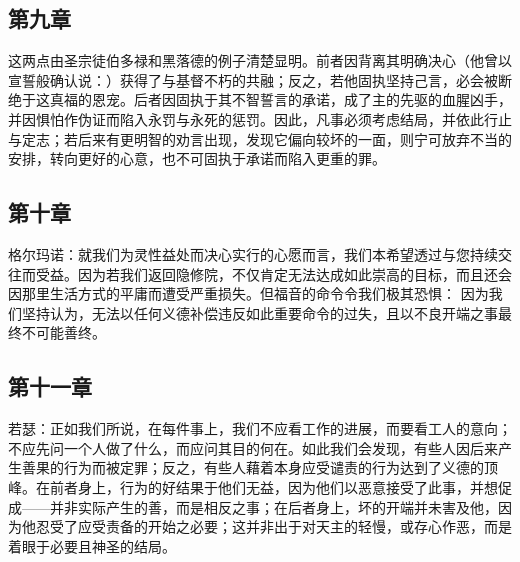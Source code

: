 
\subsection{第九章}

\par

这两点由圣宗徒伯多禄和黑落德的例子清楚显明。前者因背离其明确决心（他曾以宣誓般确认说：）获得了与基督不朽的共融；反之，若他固执坚持己言，必会被断绝于这真福的恩宠。后者因固执于其不智誓言的承诺，成了主的先驱的血腥凶手，并因惧怕作伪证而陷入永罚与永死的惩罚。因此，凡事必须考虑结局，并依此行止与定志；若后来有更明智的劝言出现，发现它偏向较坏的一面，则宁可放弃不当的安排，转向更好的心意，也不可固执于承诺而陷入更重的罪。\par


\subsection{第十章}

\par

格尔玛诺：就我们为灵性益处而决心实行的心愿而言，我们本希望透过与您持续交往而受益。因为若我们返回隐修院，不仅肯定无法达成如此崇高的目标，而且还会因那里生活方式的平庸而遭受严重损失。但福音的命令令我们极其恐惧： 因为我们坚持认为，无法以任何义德补偿违反如此重要命令的过失，且以不良开端之事最终不可能善终。\par


\subsection{第十一章}

\par

若瑟：正如我们所说，在每件事上，我们不应看工作的进展，而要看工人的意向；不应先问一个人做了什么，而应问其目的何在。如此我们会发现，有些人因后来产生善果的行为而被定罪；反之，有些人藉着本身应受谴责的行为达到了义德的顶峰。在前者身上，行为的好结果于他们无益，因为他们以恶意接受了此事，并想促成——并非实际产生的善，而是相反之事；在后者身上，坏的开端并未害及他，因为他忍受了应受责备的开始之必要；这并非出于对天主的轻慢，或存心作恶，而是着眼于必要且神圣的结局。\par

